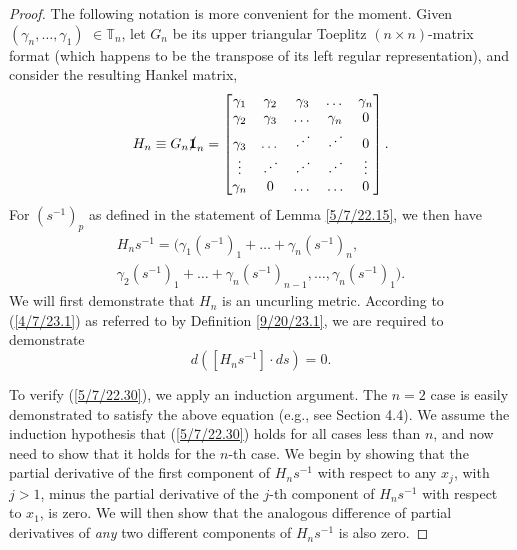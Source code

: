 \documentclass{amsart}
\numberwithin{equation}{section}
\theoremstyle{definition}
\numberwithin{theorem}{section}
\begin{document}
\begin{proof} The following notation is more convenient for the moment.  Given $(\gamma_n,\dots,\gamma_1)$ $\in \mathbb{T}_n$, let $G_n$ be its upper triangular Toeplitz $(n\times n)$-matrix format (which happens to be the transpose of its left regular representation), and consider the resulting Hankel matrix, 
\begin{equation}\label{5/7/22.20} H_n \equiv G_n \slashed{\bf 1}_n = \begin{bmatrix} \gamma_1 & \gamma_2 & \gamma_3 & \dots & \gamma_n \\ \gamma_2 & \gamma_3 & \dots & \gamma_n & 0 \\ \gamma_3 & \dots & \iddots & \iddots & 0  \\ \vdots & \iddots & \iddots & \iddots & \vdots \\ \gamma_n & 0 & \dots & \ldots & 0 \end{bmatrix}.\end{equation}
For $\left( s^{-1} \right)_p$ as defined in the statement of Lemma \ref{5/7/22.15}, we then have
\begin{multline}  H_n s^{-1}   =  \Big( \gamma_1\left( s^{-1} \right)_1  + \dots + \gamma_n \left( s^{-1} \right)_n, \\ \gamma_2\left( s^{-1} \right)_1  + \dots + \gamma_n \left( s^{-1} \right)_{n-1}, 
  \dots , 
 \gamma_n \left( s^{-1} \right)_1 \Big). \label{5/7/22.40}
\end{multline}
 We will first demonstrate that $H_n$ is an uncurling metric.  According to (\ref{4/7/23.1}) as referred to by Definition \ref{9/20/23.1}, we are required to demonstrate 
\begin{equation}\label{5/7/22.30} d\left([H_n s^{-1}]\cdot ds\right) = 0.\end{equation}  

To verify (\ref{5/7/22.30}), we apply an induction argument.  The $n=2$ case is easily demonstrated to satisfy the above equation (e.g., see Section 4.4).  We assume the induction hypothesis that (\ref{5/7/22.30}) holds for all cases less than $n$, and now need to show that it holds for the $n$-th case.  
We begin by showing that the partial derivative of the first component of $H_n s^{-1}$ with respect to any $x_j$, with $j>1$, minus the partial derivative of the $j$-th component of $H_n s^{-1}$ with respect to $x_1$, is zero. We will then show that the analogous difference of partial derivatives of {\it any} two different components of $H_ns^{-1}$ is also zero.


\end{proof}
\end{document}
